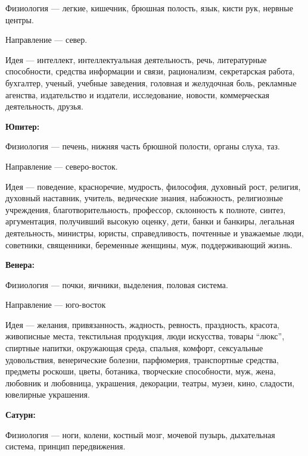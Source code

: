 \begin{myenum}[topsep=0]
		\begin{mydescr}
			\item[Физиология] --- легкие, кишечник, брюшная полость, язык, кисти рук, нервные центры.
			\item[Направление] --- север.
			\item[Идея] --- интеллект, интеллектуальная деятельность, речь, литературные способности, средства информации и связи, рационализм, секретарская работа, бухгалтер, ученый, учебные заведения, головная и желудочная боль, рекламные агенства, издательство и издатели, исследование, новости, коммерческая деятельность, друзья.
		\end{mydescr}
	\item \textbf{Юпитер:}
		\begin{mydescr}
			\item[Физиология] --- печень, нижняя часть брюшной полости, органы слуха, таз.
			\item[Направление] --- северо-восток.
			\item[Идея] --- поведение, красноречие, мудрость, философия, духовный рост, религия, духовный наставник, учитель, ведические знания, набожность, религиозные учреждения, благотворительность, профессор, склонность к полноте, синтез, аргументация, получивший высокую оценку, дети, банки и банкиры, легальная деятельность, министры, юристы, справедливость, почтенные и уважаемые люди, советники, священники, беременные женщины, муж, поддерживающий жизнь.
		\end{mydescr}
	\item \textbf{Венера:}
		\begin{mydescr}
			\item[Физиология] --- почки, яичники, выделения, половая система.
			\item[Направление] --- юго-восток
			\item[Идея] --- желания, привязанность, жадность, ревность, праздность, красота, живописные места, текстильная продукция, люди искусства, товары ``люкс'', спиртные напитки, окружающая среда, спальня, комфорт, сексуальные удовольствия, венерические болезни, парфюмерия, транспортные средства, предметы роскоши, цветы, ботаника, творческие способности, муж, жена, любовник и любовница, украшения, декорации, театры, музеи, кино, сладости, ювелирные украшения.
		\end{mydescr}
	\item \textbf{Сатурн:}
		\begin{mydescr}
			\item[Физиология] --- ноги, колени, костный мозг, мочевой пузырь, дыхательная система, принцип передвижения.

\end{mydescr}
\end{myenum}
